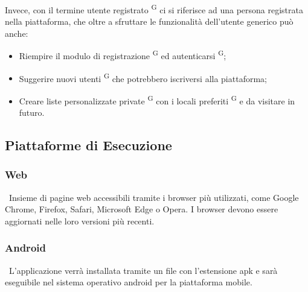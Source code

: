 Invece, con il termine utente registrato \textsuperscript{G} ci si riferisce ad una persona registrata nella piattaforma, che oltre a sfruttare le funzionalità dell’utente generico può anche:

\begin{itemize}
  \item Riempire il modulo di registrazione \textsuperscript{G} ed autenticarsi \textsuperscript{G};
  \item Suggerire nuovi utenti \textsuperscript{G} che potrebbero iscriversi alla piattaforma;
  \item Creare liste personalizzate private \textsuperscript{G} con i locali preferiti \textsuperscript{G} e da visitare in futuro.
\end{itemize}

\subsection{Piattaforme di Esecuzione}

\subsubsection{Web} \ 
Insieme di pagine web accessibili tramite i browser più utilizzati, come Google Chrome, Firefox, Safari, Microsoft Edge o Opera. I browser devono essere aggiornati nelle loro versioni più recenti.

\subsubsection{Android} \ 
L'applicazione verrà installata tramite un file con l’estensione apk e sarà eseguibile nel sistema operativo android per la piattaforma mobile.

